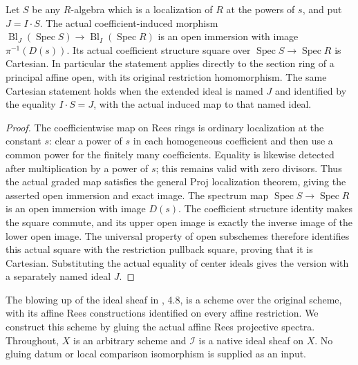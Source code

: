 \begin{theorem}\label{thm:affine-blowup-general-localization}
\leanok
Let $S$ be any $R$-algebra which is a localization of $R$ at the powers of
$s$, and put $J=I\cdot S$. The actual coefficient-induced morphism
$\operatorname{Bl}_J(\operatorname{Spec}S)\to\operatorname{Bl}_I(\operatorname{Spec}R)$
is an open immersion with image $\pi^{-1}(D(s))$. Its actual coefficient
structure square over $\operatorname{Spec}S\to\operatorname{Spec}R$ is Cartesian.
In particular the statement applies directly to the section ring of a
principal affine open, with its original restriction homomorphism. The same
Cartesian statement holds when the extended ideal is named $J$ and identified
by the equality $I\cdot S=J$, with the actual induced map to that named ideal.
\end{theorem}
\begin{proof}
The coefficientwise map on Rees rings is ordinary localization at the
constant $s$: clear a power of $s$ in each homogeneous coefficient and
then use a common power for the finitely many coefficients. Equality is
likewise detected after multiplication by a power of $s$; this remains
valid with zero divisors. Thus the actual graded map satisfies the general
Proj localization theorem, giving the asserted open immersion and exact
image. The spectrum map $\operatorname{Spec}S\to\operatorname{Spec}R$ is
an open immersion with image $D(s)$. The coefficient structure identity
makes the square commute, and its upper open image is exactly the inverse
image of the lower open image. The universal property of open subschemes
therefore identifies this actual square with the restriction pullback
square, proving that it is Cartesian. Substituting the actual equality of
center ideals gives the version with a separately named ideal $J$.
\end{proof}
\endgroup

\begingroup

The blowing up of the ideal sheaf in \cite{deJong1996}, 4.8, is a
scheme over the original scheme, with its affine Rees constructions
identified on every affine restriction. We construct this scheme by
gluing the actual affine Rees projective spectra. Throughout, $X$ is
an arbitrary scheme and $\mathcal I$ is a native ideal sheaf on $X$.
No gluing datum or local comparison isomorphism is supplied as an input.

